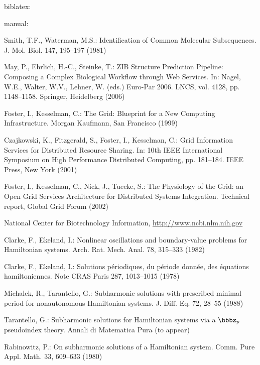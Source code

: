 \documentclass{llncs}
\begin{document}
\nocite{*} biblatex:
\printbibliography

\newpage
manual:
\begin{thebibliography}{10}
Smith, T.F., Waterman, M.S.:
Identification of Common Molecular Subsequences.
J. Mol. Biol. 147, 195--197 (1981)

May, P., Ehrlich, H.-C., Steinke, T.:
ZIB Structure Prediction Pipeline: Composing a Complex Biological Workflow through Web Services.
In: Nagel, W.E., Walter, W.V., Lehner, W. (eds.) Euro-Par 2006.
LNCS, vol. 4128, pp. 1148--1158. Springer, Heidelberg (2006)

Foster, I., Kesselman, C.:
The Grid: Blueprint for a New Computing Infrastructure.
Morgan Kaufmann, San Francisco (1999)

Czajkowski, K., Fitzgerald, S., Foster, I., Kesselman, C.:
Grid Information Services for Distributed Resource Sharing.
In: 10th IEEE International Symposium on High Performance Distributed Computing,
pp. 181--184. IEEE Press, New York (2001)

Foster, I., Kesselman, C., Nick, J., Tuecke, S.:
The Physiology of the Grid:
an Open Grid Services Architecture for Distributed Systems Integration.
Technical report, Global Grid Forum (2002)

National Center for Biotechnology Information,
\url{http://www.ncbi.nlm.nih.gov}

Clarke, F., Ekeland, I.:
Nonlinear oscillations and boundary-value problems for Hamiltonian systems.
Arch. Rat. Mech. Anal. 78, 315--333 (1982)

Clarke, F., Ekeland, I.:
Solutions p\'{e}riodiques, du p\'{e}riode donn\'{e}e, des \'{e}quations hamiltoniennes.
Note CRAS Paris 287, 1013--1015 (1978)

Michalek, R., Tarantello, G.:
Subharmonic solutions with prescribed minimal period for nonautonomous Hamiltonian systems.
J. Diff. Eq. 72, 28--55 (1988)

Tarantello, G.:
Subharmonic solutions for Hamiltonian systems via a $\bbbz_{p}$ pseudoindex theory.
Annali di Matematica Pura (to appear)

Rabinowitz, P.:
On subharmonic solutions of a Hamiltonian system.
Comm. Pure Appl. Math. 33, 609--633 (1980)
\end{thebibliography}
\end{document}
